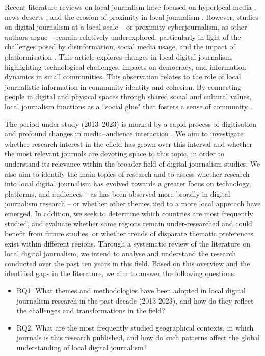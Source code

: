 \documentclass[english]{textolivre}
\begin{document}
Recent literature reviews on local journalism have focused on hyperlocal media \cite{negreira-rey2021, negreira-rey_amigo2022}, news deserts \cite{rodriguezurra2024}, and the erosion of proximity in local journalism \cite{mota2023}. However, studies on digital journalism at a local scale – or proximity cyberjournalism, as other authors argue \cite{lopez-garcia2008, jeronimo2015} – remain relatively underexplored, particularly in light of the challenges posed by disinformation, social media usage, and the impact of platformisation \cite{poell2020plataformizacao, morais2023}. This article explores changes in local digital journalism, highlighting technological challenges, impacts on democracy, and information dynamics in small communities. This observation relates to the role of local journalistic information in community identity and cohesion. By connecting people in digital and physical spaces through shared social and cultural values, local journalism functions as a ``social glue" that fosters a sense of community \cite{hess2015}.

The period under study (2013–2023) is marked by a rapid process of digitisation and profound changes in media–audience interaction \cite{heiselberg2024}. We aim to investigate whether research interest in the efield has grown over this interval and whether the most relevant journals are devoting space to this topic, in order to understand its relevance within the broader field of digital journalism studies. We also aim to identify the main topics of research and to assess whether research into local digital journalism has evolved towards a greater focus on technology, platforms, and audiences -- as has been observed more broadly in digital journalism research \cite{steensen2019} -- or whether other themes tied to a more local approach have emerged. In addition, we seek to determine which countries are most frequently studied, and evaluate whether some regions remain under-researched and could benefit from future studies, or whether trends of disparate thematic preferences exist within different regions. Through a systematic review of the literature on local digital journalism, we intend to analyse and understand the research conducted over the past ten years in this field. Based on this overview and the identified gaps in the literature, we aim to answer the following questions:

\begin{itemize}
    \item RQ1. What themes and methodologies have been adopted in local digital journalism research in the past decade (2013-2023), and how do they reflect the challenges and transformations in the field?
    \item RQ2. What are the most frequently studied geographical contexts, in which journals is this research published, and how do such  patterns affect the global understanding of local digital journalism?  
\end{itemize}
\end{document}
